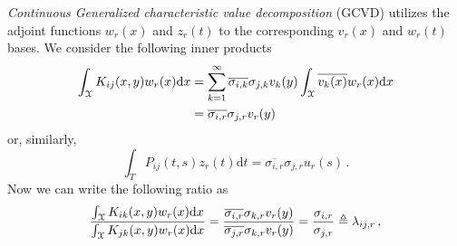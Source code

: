 \documentclass[10pt]{article}
\newcommand{\norm}[1]{\left\Vert#1\right\Vert}
\begin{document}
{\em Continuous Generalized characteristic value decomposition} (GCVD) utilizes the adjoint functions $w_r(x)$ and $z_r(t)$ to the corresponding $v_r(x)$ and $w_r(t)$ bases. We consider the following inner products
\begin{equation}
\begin{aligned}
	\int_{\cal X} K_{ij}(x,y) w_r(x) \mathrm{d} x 
	& = \sum_{k=1}^\infty 
	\overline{\sigma_{i,k}}\sigma_{j,k}v_{k}(y)
	\int_{\cal X} \overline{v_{k}(x)} w_r(x) \mathrm{d} x \\
	& = 
	\overline{\sigma_{i,r}}\sigma_{j,r}v_{r}(y)
\end{aligned}
\end{equation}
or, similarly,
\begin{equation}
	\int_T P_{ij}(t,s) z_r(t) \mathrm{d} t = \overline{\sigma_{i,r}}\sigma_{j,r}u_r(s) \,.
\end{equation}
Now we can write the following
ratio as
\begin{equation}
	\frac{\int_{\cal X} K_{ik}(x,y) w_r(x) \mathrm{d} x}{\int_{\cal X} K_{jk}(x,y) w_r(x) \mathrm{d} x }
	= \frac{
	\overline{\sigma_{i,r}}\sigma_{k,r}v_{r}(y)}{ 
	\overline{\sigma_{j,r}}\sigma_{k,r}v_{r}(y)}
	=\frac{
	\sigma_{i,r}}{ 
	\sigma_{j,r}}\triangleq\lambda_{ij,r} \,,
\end{equation}
\end{document}
